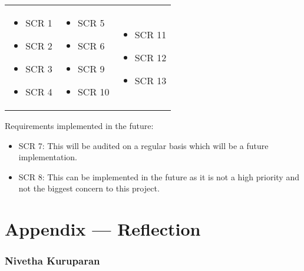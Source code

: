 \documentclass{article}
\begin{document}
\renewcommand{\arraystretch}{1.2}
\begin{tabular}{p{} p{} p{}}
    \begin{itemize}[wide=0pt]
        \item SCR 1
        \item SCR 2
        \item SCR 3
        \item SCR 4
    \end{itemize} &
    \begin{itemize}[wide=0pt]
        \item SCR 5
        \item SCR 6
        \item SCR 9
        \item SCR 10
    \end{itemize} &
    \begin{itemize}[wide=0pt]
        \item SCR 11
        \item SCR 12
        \item SCR 13
    \end{itemize} \\
\end{tabular}

\medskip

\noindent
Requirements implemented in the future:
\begin{itemize}
    \item SCR 7: This will be audited on a regular basis which will be a future implementation.
    \item SCR 8: This can be implemented in the future as it is not a high priority and not the biggest concern to this project.
\end{itemize}

\newpage{}

\section*{Appendix --- Reflection}

\subsubsection*{Nivetha Kuruparan}
\end{document}
